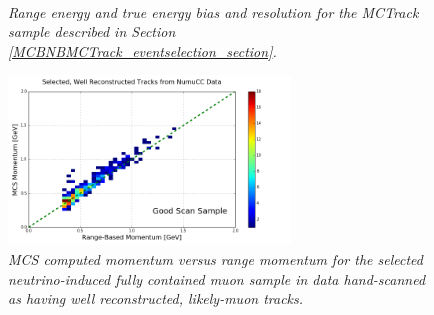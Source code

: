 \begin{figure}
\centering
\mbox{
	\quad
	}
\caption{\textit{Range energy and true energy bias and resolution for the {\sc MCTrack} sample described in Section \ref{MCBNBMCTrack_eventselection_section}.}}
\label{pub_plot_2}
\end{figure}


\begin{figure}
\centering
	\includegraphics[width=75mm]{Figures/MCS_range_momentum_DataRecoTracks_goodhandscan.png}
\caption{\textit{MCS computed momentum versus range momentum for the selected neutrino-induced fully contained muon sample in data hand-scanned as having well reconstructed, likely-muon tracks.}}
\label{pub_plot_3}
\end{figure}


